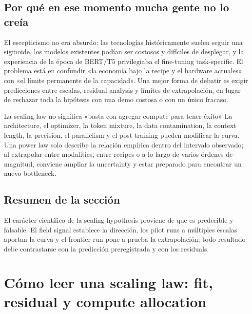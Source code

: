 \documentclass[a4paper]{article}
\begin{document}

\subsection{Por qué en ese momento mucha gente no lo creía}

El escepticismo no era absurdo: las tecnologías históricamente suelen seguir una sigmoide, los modelos existentes podían ser costosos y difíciles de desplegar, y la experiencia de la época de BERT/T5 privilegiaba el fine-tuning task-specific. El problema está en confundir «la economía bajo la recipe y el hardware actuales» con «el límite permanente de la capacidad». Una mejor forma de debatir es exigir predicciones entre escalas, residual analysis y límites de extrapolación, en lugar de rechazar toda la hipótesis con una demo costosa o con un único fracaso.

\begin{warningbox}{La scaling law no significa «basta con agregar compute para tener éxito»}
La architecture, el optimizer, la token mixture, la data contamination, la context length, la precision, el parallelism y el post-training pueden modificar la curva. Una power law solo describe la relación empírica dentro del intervalo observado; al extrapolar entre modalities, entre recipes o a lo largo de varios órdenes de magnitud, conviene ampliar la uncertainty y estar preparado para encontrar un nuevo bottleneck.
\end{warningbox}

\subsection{Resumen de la sección}

El carácter científico de la scaling hypothesis proviene de que es predecible y falsable. El field signal establece la dirección, los pilot runs a múltiples escalas aportan la curva y el frontier run pone a prueba la extrapolación; todo resultado debe contrastarse con la predicción preregistrada y con los residuals.
\section{Cómo leer una scaling law: fit, residual y compute allocation}
\end{document}
